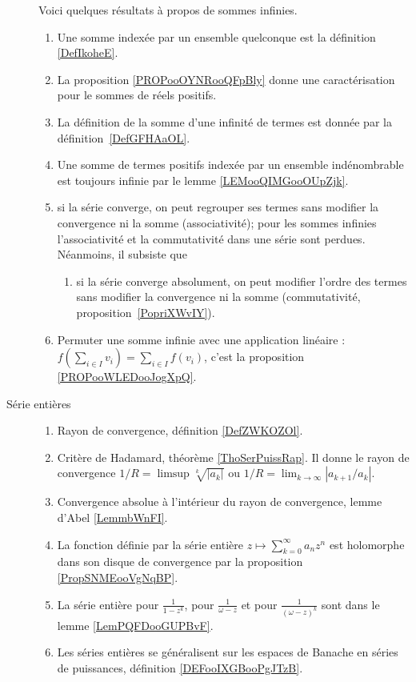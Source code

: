 \begin{description}
		Voici quelques résultats à propos de sommes infinies.%
		\begin{enumerate}
			\item
			      Une somme indexée par un ensemble quelconque est la définition \ref{DefIkoheE}.
			\item
			      La proposition \ref{PROPooOYNRooQFpBly} donne une caractérisation pour le sommes de réels positifs.
			\item
			      La définition de la somme d'une infinité de termes est donnée par la définition~\ref{DefGFHAaOL}.
			\item
			      Une somme de termes positifs indexée par un ensemble indénombrable est toujours infinie par le lemme \ref{LEMooQIMGooOUpZjk}.
			\item
			      si la série converge, on peut regrouper ses termes sans modifier la convergence ni la somme (associativité);
			      pour les sommes infinies l'associativité et la commutativité dans une série sont perdues. Néanmoins, il subsiste que
			      \begin{enumerate}
				      \item
				            si la série converge absolument, on peut modifier l'ordre des termes sans modifier la convergence ni la somme (commutativité, proposition~\ref{PopriXWvIY}).
			      \end{enumerate}
			\item Permuter une somme infinie avec une application linéaire : \( f(\sum_{i\in I}v_i)=\sum_{i\in I}f(v_i)\), c'est la proposition \ref{PROPooWLEDooJogXpQ}.
		\end{enumerate}
	\item[Série entières]
		\begin{enumerate}
			\item
			      Rayon de convergence, définition \ref{DefZWKOZOl}.
			\item
			      Critère de Hadamard, théorème \ref{ThoSerPuissRap}. Il donne le rayon de convergence \( 1/R=\limsup \sqrt[k]{| a_k |}\) ou \( 1/R=\lim_{k\to \infty}| a_{k+1}/a_k |\).
			\item
			      Convergence absolue à l'intérieur du rayon de convergence, lemme d'Abel \ref{LemmbWnFI}.
			\item
			      La fonction définie par la série entière  \(z\mapsto \sum_{k=0}^{\infty}a_nz^n\) est holomorphe dans son disque de convergence par la proposition \ref{PropSNMEooVgNqBP}.
			\item
			      La série entière pour \( \frac{1}{ 1-z^k }\), pour \( \frac{1}{ \omega-z }\) et pour \( \frac{1}{ (\omega-z)^k }\) sont dans le lemme \ref{LemPQFDooGUPBvF}.
			\item
			      Les séries entières se généralisent sur les espaces de Banache en séries de puissances, définition \ref{DEFooIXGBooPgJTzB}.
		\end{enumerate}
\end{description}
